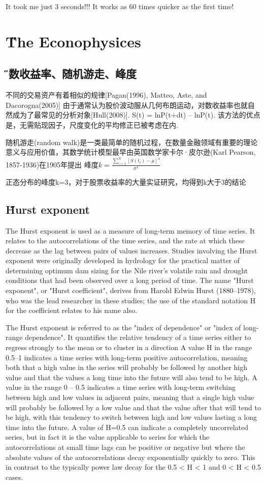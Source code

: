 \documentclass[12pt]{article}
\begin{document}
It took me just 3 seconds!!! It works as 60 times quicker as the first time! 

\section{\H The Econophysices}
\subsection{\H 对数收益率、随机游走、峰度}
不同的交易资产有着相似的规律[Pagan(1996), Matteo, Aste, and Dacorogna(2005)]
由于通常认为股价波动服从几何布朗运动，对数收益率也就自然成为了最常见的分析对象[Hull(2008)]. S(t) = lnP(t+dt) – lnP(t). 该方法的优点是，无需贴现因子，尺度变化的平均修正已被考虑在内.

随机游走(random walk)是一类最简单的随机过程，在数量金融领域有重要的理论意义与应用价值，其数学统计模型最早由英国数学家卡尔·皮尔逊(Karl Pearson, 1857-1936)在1905年提出
峰度$k=\frac{\sum^{N}_{i=1}[S(t_i)-\mu]^4}{\sigma^4}$

正态分布的峰度k=3，对于股票收益率的大量实证研究，均得到k大于3的结论

\subsection{\H Hurst exponent}
The Hurst exponent is used as a measure of long-term memory of time series. It relates to the autocorrelations of the time series, and the rate at which these decrease as the lag between pairs of values increases. Studies involving the Hurst exponent were originally developed in hydrology for the practical matter of determining optimum dam sizing for the Nile river's volatile rain and drought conditions that had been observed over a long period of time. The name "Hurst exponent", or "Hurst coefficient", derives from Harold Edwin Hurst (1880–1978), who was the lead researcher in these studies; the use of the standard notation H for the coefficient relates to his name also.

The Hurst exponent is referred to as the "index of dependence" or "index of long-range dependence". It quantifies the relative tendency of a time series either to regress strongly to the mean or to cluster in a direction A value H in the range 0.5–1 indicates a time series with long-term positive autocorrelation, meaning both that a high value in the series will probably be followed by another high value and that the values a long time into the future will also tend to be high. A value in the range 0 – 0.5 indicates a time series with long-term switching between high and low values in adjacent pairs, meaning that a single high value will probably be followed by a low value and that the value after that will tend to be high, with this tendency to switch between high and low values lasting a long time into the future. A value of H=0.5 can indicate a completely uncorrelated series, but in fact it is the value applicable to series for which the autocorrelations at small time lags can be positive or negative but where the absolute values of the autocorrelations decay exponentially quickly to zero. This in contrast to the typically power law decay for the 0.5 < H < 1 and 0 < H < 0.5 cases.
\end{document}
